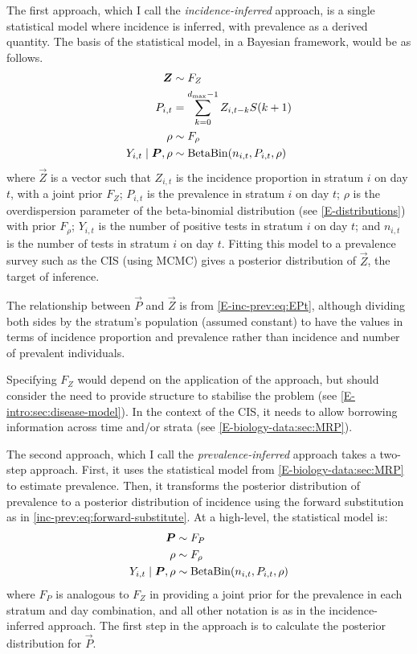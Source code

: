 \documentclass[thesis.tex]{subfiles}
\begin{document}
The first approach, which I call the \emph{incidence-inferred} approach, is a single statistical model where incidence is inferred, with prevalence as a derived quantity.
The basis of the statistical model, in a Bayesian framework, would be as follows.
\begin{align}
    \bm{Z} &\sim F_Z \\
    P_{i,t}  &= \sum_{k=0}^{d_\text{max}-1} Z_{i,t-k} S(k+1) \\
    \rho &\sim F_\rho \\
    Y_{i,t} \mid \bm{P}, \rho &\sim \operatorname{BetaBin}(n_{i,t}, P_{i,t}, \rho)
\end{align}
where $\vec{Z}$ is a vector such that $Z_{i,t}$ is the incidence proportion in stratum $i$ on day $t$, with a joint prior $F_Z$; $P_{i,t}$ is the prevalence in stratum $i$ on day $t$; $\rho$ is the overdispersion parameter of the beta-binomial distribution (see \cref{E-distributions}) with prior $F_\rho$; $Y_{i,t}$ is the number of positive tests in stratum $i$ on day $t$; and $n_{i,t}$ is the number of tests in stratum $i$ on day $t$.
Fitting this model to a prevalence survey such as the CIS (\eg using MCMC) gives a posterior distribution of $\vec{Z}$, the target of inference.

The relationship between $\vec{P}$ and $\vec{Z}$ is from \cref{E-inc-prev:eq:EPt}, although dividing both sides by the stratum's population (assumed constant) to have the values in terms of incidence proportion and prevalence rather than incidence and number of prevalent individuals.

Specifying $F_Z$ would depend on the application of the approach, but should consider the need to provide structure to stabilise the problem (see \cref{E-intro:sec:disease-model}).
In the context of the CIS, it needs to allow borrowing information across time and/or strata (see \cref{E-biology-data:sec:MRP}).

The second approach, which I call the \emph{prevalence-inferred} approach takes a two-step approach.
First, it uses the statistical model from \cref{E-biology-data:sec:MRP} to estimate prevalence.
Then, it transforms the posterior distribution of prevalence to a posterior distribution of incidence using the forward substitution as in \cref{inc-prev:eq:forward-substitute}.
At a high-level, the statistical model is:
\begin{align}
    \bm{P}  &\sim F_P \\
    \rho &\sim F_\rho \\
    Y_{i,t} \mid \bm{P}, \rho &\sim \operatorname{BetaBin}(n_{i,t}, P_{i,t}, \rho)
\end{align}
where $F_P$ is analogous to $F_Z$ in providing a joint prior for the prevalence in each stratum and day combination, and all other notation is as in the incidence-inferred approach.
The first step in the approach is to calculate the posterior distribution for $\vec{P}$.
\end{document}

